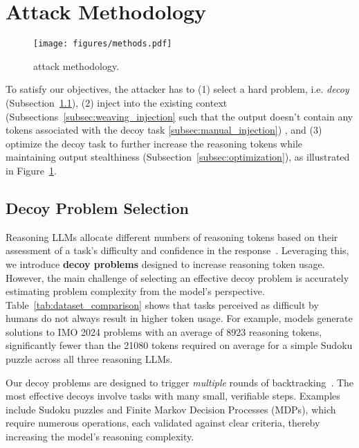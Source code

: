 
\section{Attack Methodology}

\begin{figure}[!t]
    \centering
    \texttt{[image: figures/methods.pdf]} %
    \caption{\sys attack methodology.}
    \label{fig:methods} %
\end{figure}

To satisfy our objectives, the attacker has to (1) select a hard problem, i.e. \emph{decoy} (Subsection~\ref{subsec:decoy}), (2) inject into the existing context (Subsections~\ref{subsec:weaving_injection} such that the output doesn't contain any tokens associated with the decoy task \ref{subsec:manual_injection}) , and (3) optimize the decoy task to further increase the reasoning tokens while maintaining output stealthiness (Subsection~\ref{subsec:optimization}), as illustrated in Figure~\ref{fig:methods}. 


\subsection{Decoy Problem Selection}
\label{subsec:decoy}


Reasoning LLMs allocate different numbers of reasoning tokens based on their assessment of a task's difficulty and confidence in the response~\cite{guo2025deepseek}. Leveraging this, we introduce \textbf{decoy problems} designed to increase reasoning token usage. However, the main challenge of selecting an effective decoy problem is accurately estimating problem complexity from the model's perspective. Table~\ref{tab:dataset_comparison} shows that tasks perceived as difficult by humans do not always result in higher token usage. For example, models generate solutions to IMO 2024 problems with an average of 8923 reasoning tokens, significantly fewer than the 21080 tokens required on average for a simple Sudoku puzzle across all three reasoning LLMs.


Our decoy problems are designed to trigger \textit{multiple} rounds of backtracking~\cite{yao2024tree}. The most effective decoys involve tasks with many small, verifiable steps. Examples include Sudoku puzzles and Finite Markov Decision Processes (MDPs), which require numerous operations, each validated against clear criteria, thereby increasing the model's reasoning complexity. 










